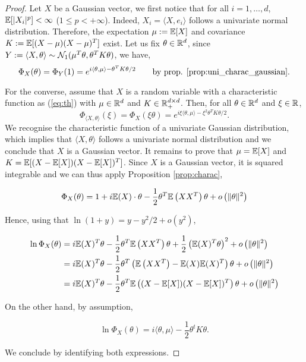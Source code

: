 \documentclass{article}
\begin{document}
\begin{proof}
  Let $X$ be a Gaussian vector, we first notice that for all $i=1,\ldots,d$,
  $\mathbb{E}[|X_i|^p] < \infty$ ($1\leq p < +\infty$). Indeed, $X_i = \langle X,e_i
  \rangle$ follows a univariate normal distribution. Therefore, the expectation
  $\mu:=\mathbb{E}[X]$ and covariance $K:=\mathbb{E}[(X-\mu)(X-\mu)^T]$ exist. 
  Let us fix $\theta \in \mathbb{R}^{d}$, since $Y:= \langle X,\theta \rangle \sim
  \mathcal{N}_1(\mu^T\theta, \theta^TK\theta)$, we have, $$\Phi_{X}(\theta) = \Phi_Y(1)
  = e^{i\langle \theta,\mu \rangle - \theta^TK\theta/2} \qquad \text{by prop. \ref{prop:uni_charac_gaussian}}.$$

  For the converse, assume that $X$ is a random variable with a characteristic
  function as (\ref{eq:th}) with $\mu \in \mathbb{R}^{d}$ and $K \in \mathbb{R}^{d\times d}_+$. Then,
  for all $\theta \in \mathbb{R}^{d}$ and $\xi \in \mathbb{R}$,
  $$\Phi_{\langle X,\theta \rangle}(\xi) = \Phi_X(\xi \theta)
  = e^{i \xi \langle \theta,\mu \rangle - \xi^2 \theta^TK\theta/2}.$$
  We recognise the characteristic function of a univariate Gaussian
  distribution, which implies that $\langle X,\theta \rangle$ follows a
  univariate normal distribution and we conclude that $X$ is a Gaussian vector. It
  remains to prove that $\mu=\mathbb{E}[X]$ and $K=\mathbb{E}[(X-\mathbb{E}[X])(X-\mathbb{E}[X])^T]$. Since $X$
  is a Gaussian vector, it is squared integrable and we can thus apply Proposition \ref{prop:charac},

  \begin{equation*}
    \Phi_{X}(\theta)=1 + i \mathbb{E}(X) \cdot \theta-\frac{1}{2} \theta^T \mathbb{E}\left(XX^T\right) \theta+o\left(\|\theta\|^{2}\right)
  \end{equation*}

  Hence, using that $\ln(1+y) = y - y^2/2 + o(y^2)$,

  \begin{equation*}
    \begin{aligned}
      \ln \Phi_{X}(\theta) &= i \mathbb{E}(X)^T \theta-\frac{1}{2} \theta^T \mathbb{E}\left(XX^T\right) \theta +\frac{1}{2}\left(\mathbb{E}(X)^T \theta\right)^{2}+o\left(\|\theta\|^{2}\right) \\
      &= i \mathbb{E}(X)^T \theta-\frac{1}{2} \theta^T\left(\mathbb{E}\left(XX^T\right)-\mathbb{E}(X)\mathbb{E}(X)^T\right) \theta+o\left(\|\theta\|^{2}\right) \\
      &= i \mathbb{E}(X)^T \theta-\frac{1}{2} \theta^T\mathbb{E}\left((X-\mathbb{E}[X])(X-\mathbb{E}[X])^T\right) \theta+o\left(\|\theta\|^{2}\right)
    \end{aligned}
  \end{equation*}

  On the other hand, by assumption,

  \begin{equation*}
    \ln \Phi_{X}(\theta) = i\langle \theta,\mu \rangle -\frac{1}{2} \theta^t K \theta.
  \end{equation*}

  We conclude by identifying both expressions.
\end{proof}
\end{document}
